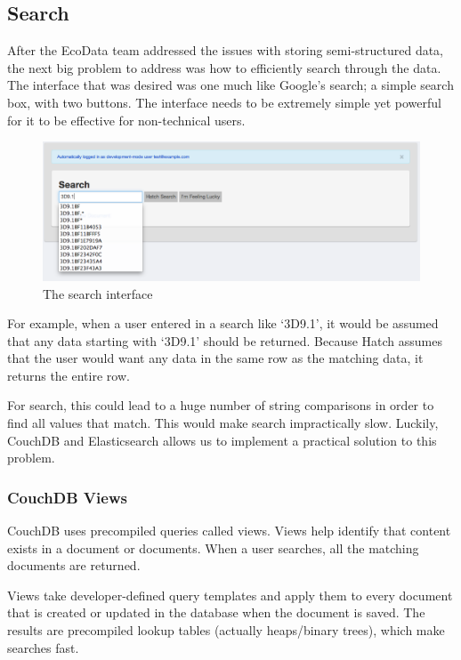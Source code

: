 \subsection{Search}
After the EcoData team addressed the issues with storing semi-structured data, the next 
big problem to address was how to efficiently search through the data. The interface 
that was desired was one much like Google's search; a simple search box, with two
buttons. The interface needs to be extremely simple yet powerful for it to be 
effective for non-technical users. 

\begin{figure}[h]
	\begin{center}
	\includegraphics[width=120mm]{images/search_ss1}
	\caption{The search interface} 
	\label{search_ss1}
	\end{center}
\end{figure}

For example, when a user entered in a search like `3D9.1', it would be assumed that 
any data starting with `3D9.1' should be returned. Because Hatch assumes that
the user would want any data in the same row as the matching data, it returns
the entire row. 

For search, this could lead to a huge number of string comparisons in order to find
all values that match. This would make search impractically slow. Luckily, CouchDB and 
Elasticsearch allows us to implement a practical solution to this problem.

\subsubsection{CouchDB Views}
CouchDB uses precompiled queries called views. Views help identify that content
exists in a document or documents. When a user searches, all the matching documents
are returned.

Views take developer-defined
query templates and apply them to every document that is created or updated in the 
database when the document is saved. The results are precompiled lookup tables 
(actually heaps/binary trees), which make searches fast. 


